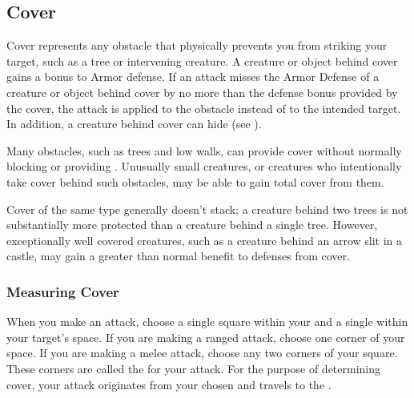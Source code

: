     \subsection{Cover}\label{Cover}

        Cover represents any obstacle that physically prevents you from striking your target, such as a tree or intervening creature.
        A creature or object behind cover gains a  bonus to Armor defense.
        If an attack misses the Armor Defense of a creature or object behind cover by no more than the defense bonus provided by the cover,
        the attack is applied to the obstacle instead of to the intended target.
        In addition, a creature behind cover can hide (see ).

         Many obstacles, such as trees and low walls, can provide cover without normally blocking  or providing .
        Unusually small creatures, or creatures who intentionally take cover behind such obstacles, may be able to gain total cover from them.

        Cover of the same type generally doesn't stack; a creature behind two trees is not substantially more protected than a creature behind a single tree.
        However, exceptionally well covered creatures, such as a creature behind an arrow slit in a castle, may gain a greater than normal benefit to defenses from cover.

        \subsubsection{Measuring Cover}

            When you make an attack, choose a single square within your  and a single  within your target's space.
            If you are making a ranged attack, choose one corner of your space.
            If you are making a melee attack, choose any two corners of your square.
            These corners are called the  for your attack.
            For the purpose of determining cover, your attack originates from your chosen  and travels to the .

